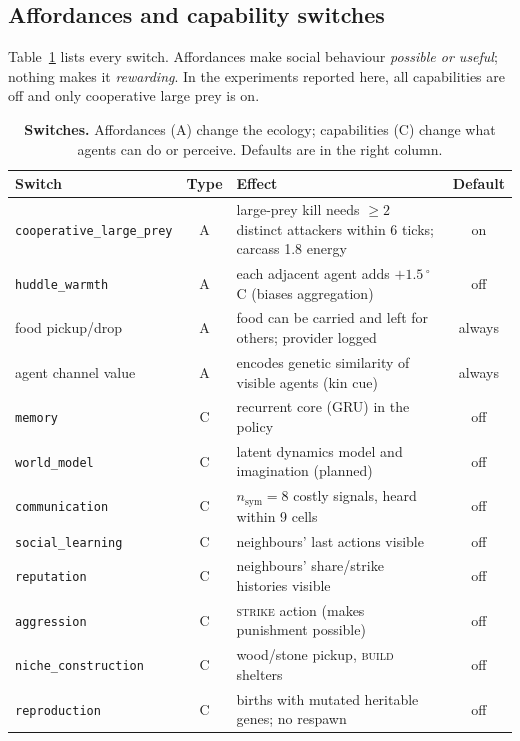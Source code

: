 \documentclass[10pt]{article}
\begin{document}
\subsection{Affordances and capability switches}
Table~\ref{tab:switches} lists every switch. Affordances make social behaviour \emph{possible or useful}; nothing
makes it \emph{rewarding}. In the experiments reported here, all capabilities are off and only cooperative large prey
is on.

\begin{table}[t]
\centering\small
\caption{\textbf{Switches.} Affordances (A) change the ecology; capabilities (C) change what agents can do or
perceive. Defaults are in the right column.}
\label{tab:switches}
\begin{tabularx}{\linewidth}{@{}l c X c@{}}
\toprule
Switch & Type & Effect & Default\\
\midrule
\texttt{cooperative\_large\_prey} & A & large-prey kill needs $\geq2$ distinct attackers within 6 ticks; carcass 1.8 energy & on\\
\texttt{huddle\_warmth} & A & each adjacent agent adds $+1.5\,^\circ$C (biases aggregation) & off\\
food pickup/drop & A & food can be carried and left for others; provider logged & always\\
agent channel value & A & encodes genetic similarity of visible agents (kin cue) & always\\
\midrule
\texttt{memory} & C & recurrent core (GRU) in the policy & off\\
\texttt{world\_model} & C & latent dynamics model and imagination (planned) & off\\
\texttt{communication} & C & $n_{\text{sym}}{=}8$ costly signals, heard within 9 cells & off\\
\texttt{social\_learning} & C & neighbours' last actions visible & off\\
\texttt{reputation} & C & neighbours' share/strike histories visible & off\\
\texttt{aggression} & C & \textsc{strike} action (makes punishment possible) & off\\
\texttt{niche\_construction} & C & wood/stone pickup, \textsc{build} shelters & off\\
\texttt{reproduction} & C & births with mutated heritable genes; no respawn & off\\
\bottomrule
\end{tabularx}
\end{table}
\end{document}
